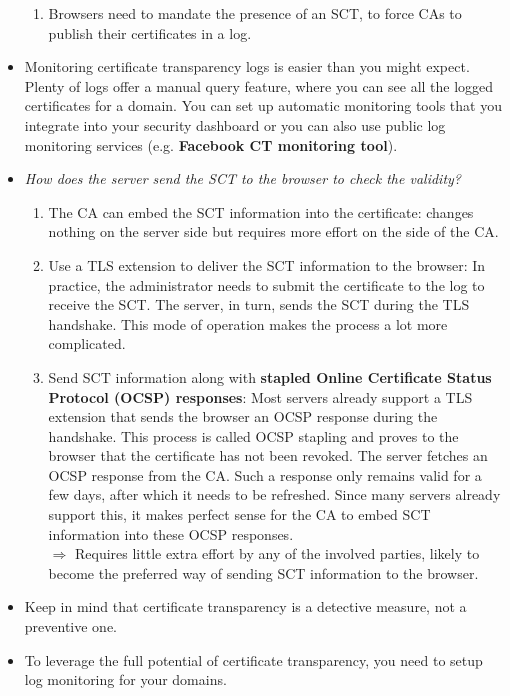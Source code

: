 \documentclass[../main.tex]{subfiles}
\begin{document}
\begin{itemize}
\begin{enumerate}
\item Browsers need to mandate the presence of an SCT, to force CAs to publish their certificates in a log.
\end{enumerate}
\item Monitoring certificate transparency logs is easier than you might expect. Plenty of logs offer a manual query feature, where you can see all the logged certificates for a domain. You can set up automatic monitoring tools that you integrate into your security dashboard or you can also use public log monitoring services (e.g. \textbf{Facebook CT monitoring tool}).
\item \emph{How does the server send the SCT to the browser to check the validity?}
\begin{enumerate}
\item The CA can embed the SCT information into the certificate: changes nothing on the server side but requires more effort on the side of the CA.
\item Use a TLS extension to deliver the SCT information to the browser: In practice, the administrator needs to submit the certificate to the log to receive the SCT. The server, in turn, sends the SCT during the TLS handshake. This mode of operation makes the process a lot more complicated.
\item Send SCT information along with \textbf{stapled Online Certificate Status Protocol (OCSP) responses}: Most servers already support a TLS extension that sends the browser an OCSP response during the handshake. This process is called OCSP stapling and proves to the browser that the certificate has not been revoked. The server fetches an OCSP response from the CA. Such a response only remains valid for a few days, after which it needs to be refreshed. Since many servers already support this, it makes perfect sense for the CA to embed SCT information into these OCSP responses.\\
$\Rightarrow$ Requires little extra effort by any of the involved parties, likely to become the preferred way of sending SCT information to the browser.
\end{enumerate}
\item Keep in mind that certificate transparency is a detective measure, not a preventive one.
\item To leverage the full potential of certificate transparency, you need to setup log monitoring for your domains.
\end{itemize}
\end{document}
